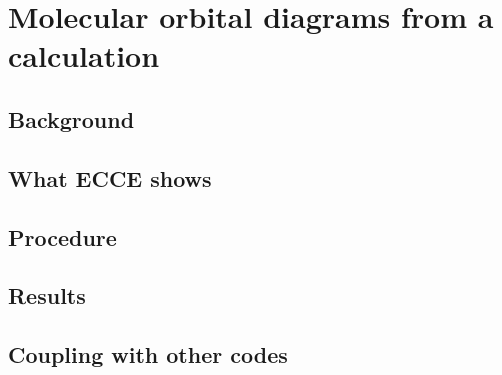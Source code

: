 \chapter{Molecular orbital diagrams from a calculation}
\label{ch:mo-analysis}

\section{Background}

\section{What ECCE shows}

\section{Procedure}

\section{Results}

\section{Coupling with other codes}

